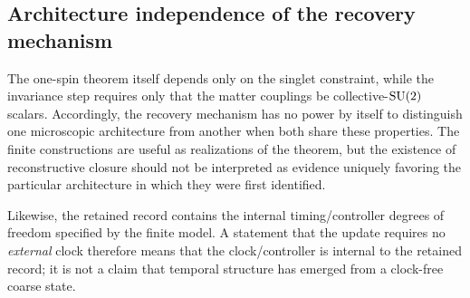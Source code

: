\subsection{Architecture independence of the recovery mechanism}

The one-spin theorem itself depends only on the singlet constraint, while the invariance step requires only that the matter couplings be collective-$\mathrm{SU}(2)$ scalars.  Accordingly, the recovery mechanism has no power by itself to distinguish one microscopic architecture from another when both share these properties.  The finite constructions are useful as realizations of the theorem, but the existence of reconstructive closure should not be interpreted as evidence uniquely favoring the particular architecture in which they were first identified.

Likewise, the retained record contains the internal timing/controller degrees of freedom specified by the finite model.  A statement that the update requires no \emph{external} clock therefore means that the clock/controller is internal to the retained record; it is not a claim that temporal structure has emerged from a clock-free coarse state.
